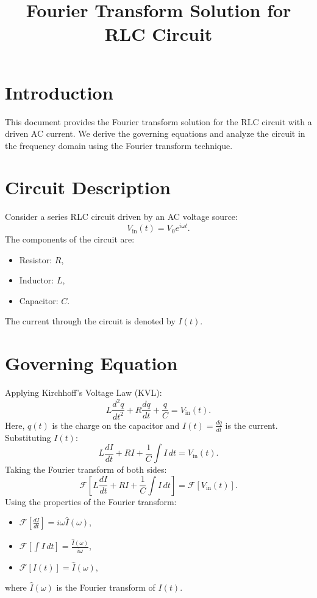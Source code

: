 \documentclass[a4paper,11pt]{article}
\begin{document}
\title{Fourier Transform Solution for RLC Circuit}
\author{}
\date{}
\maketitle

\section*{Introduction}
This document provides the Fourier transform solution for the RLC circuit with a driven AC current. We derive the governing equations and analyze the circuit in the frequency domain using the Fourier transform technique.

\section*{Circuit Description}
Consider a series RLC circuit driven by an AC voltage source:
\[
V_{\text{in}}(t) = V_0 e^{i\omega t}.
\]
The components of the circuit are:
\begin{itemize}
    \item Resistor: \(R\),
    \item Inductor: \(L\),
    \item Capacitor: \(C\).
\end{itemize}

The current through the circuit is denoted by \(I(t)\).

\section*{Governing Equation}
Applying Kirchhoff's Voltage Law (KVL):
\[
L \frac{d^2q}{dt^2} + R \frac{dq}{dt} + \frac{q}{C} = V_{\text{in}}(t).
\]
Here, \(q(t)\) is the charge on the capacitor and \(I(t) = \frac{dq}{dt}\) is the current. Substituting \(I(t)\):
\[
L \frac{dI}{dt} + R I + \frac{1}{C} \int I \, dt = V_{\text{in}}(t).
\]
Taking the Fourier transform of both sides:
\[
\mathcal{F}\left[L \frac{dI}{dt} + R I + \frac{1}{C} \int I \, dt \right] = \mathcal{F}\left[V_{\text{in}}(t)\right].
\]
Using the properties of the Fourier transform:
\begin{itemize}
    \item \(\mathcal{F}\left[\frac{dI}{dt}\right] = i\omega \hat{I}(\omega)\),
    \item \(\mathcal{F}\left[\int I \, dt\right] = \frac{\hat{I}(\omega)}{i\omega}\),
    \item \(\mathcal{F}\left[I(t)\right] = \hat{I}(\omega)\),
\end{itemize}
where \(\hat{I}(\omega)\) is the Fourier transform of \(I(t)\).
\end{document}
